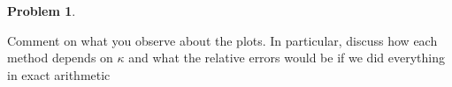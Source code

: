 \documentclass[12pt]{article}
\theoremstyle{definition}
\newtheorem{problem}{Problem}
\begin{document}
\begin{problem}
\begin{enumerate}
    Comment on what you observe about the plots. 
    In particular, discuss how each method depends on $\kappa$ and what the relative errors would be if we did everything in exact arithmetic

\end{enumerate}
\end{problem}
\end{document}
